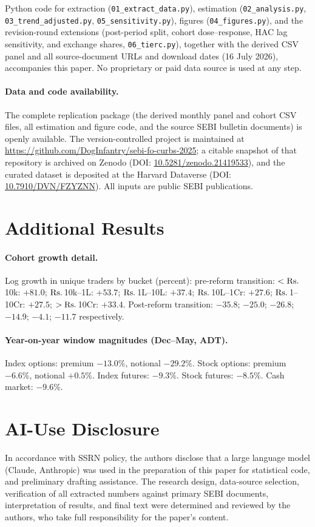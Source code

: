 \documentclass[12pt]{article}
\newcommand{\rupee}{\text{Rs.}\,}
\begin{document}
Python code for extraction (\texttt{01\_extract\_data.py}), estimation
(\texttt{02\_analysis.py}, \texttt{03\_trend\_adjusted.py},
\texttt{05\_sensitivity.py}), figures (\texttt{04\_figures.py}), and the
revision-round extensions (post-period split, cohort dose--response, HAC
lag sensitivity, and exchange shares, \texttt{06\_tierc.py}), together
with the derived CSV panel and all source-document URLs and download dates
(16 July 2026), accompanies this paper. No proprietary or paid data source
is used at any step.

\paragraph{Data and code availability.} The complete replication
package (the derived monthly panel and cohort CSV files, all estimation
and figure code, and the source SEBI bulletin documents) is openly
available. The version-controlled project is maintained at
\url{https://github.com/DogInfantry/sebi-fo-curbs-2025}; a citable
snapshot of that repository is archived on Zenodo
(DOI: \href{https://doi.org/10.5281/zenodo.21419533}{10.5281/zenodo.21419533}),
and the curated dataset is deposited at the Harvard Dataverse
(DOI: \href{https://doi.org/10.7910/DVN/FZYZNN}{10.7910/DVN/FZYZNN}).
All inputs are public SEBI publications.

\section{Additional Results}\label{app:extra}

\paragraph{Cohort growth detail.} Log growth in unique traders by bucket
(percent): pre-reform transition: $<\text{\rupee}$10k: $+81.0$;
\(\text{\rupee}\)10k--1L: $+53.7$; \(\text{\rupee}\)1L--10L: $+37.4$;
\(\text{\rupee}\)10L--1Cr: $+27.6$; \(\text{\rupee}\)1--10Cr: $+27.5$;
$>\text{\rupee}$10Cr: $+33.4$. Post-reform transition: $-35.8$; $-25.0$;
$-26.8$; $-14.9$; $-4.1$; $-11.7$ respectively.

\paragraph{Year-on-year window magnitudes (Dec--May, ADT).} Index options:
premium $-13.0\%$, notional $-29.2\%$. Stock options: premium $-6.6\%$,
notional $+0.5\%$. Index futures: $-9.3\%$. Stock futures: $-8.5\%$. Cash
market: $-9.6\%$.

\section*{AI-Use Disclosure}

In accordance with SSRN policy, the authors disclose that a large language
model (Claude, Anthropic) was used in the preparation of this paper for
statistical code, and preliminary drafting
assistance. The research design, data-source selection, verification of all
extracted numbers against primary SEBI documents, interpretation of
results, and final text were determined and reviewed by the authors, who
take full responsibility for the paper's content.
\end{document}
